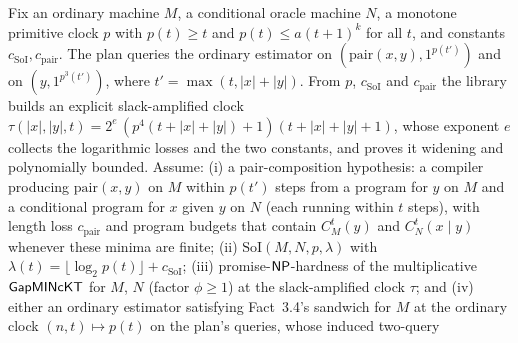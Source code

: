 \begin{theorem}
  \label{thm:avg-soi-collapse}
  \leanok
  Fix an ordinary machine $M$, a conditional oracle machine $N$, a monotone
  primitive clock $p$ with $p(t) \ge t$ and $p(t) \le a(t+1)^k$ for all $t$,
  and constants $c_{\mathrm{SoI}}, c_{\mathrm{pair}}$. The plan queries the
  ordinary estimator on $(\mathrm{pair}(x,y), 1^{p(t')})$ and on
  $(y, 1^{p^3(t')})$, where $t' = \max(t, |x|+|y|)$. From $p$,
  $c_{\mathrm{SoI}}$ and $c_{\mathrm{pair}}$ the library builds an explicit
  slack-amplified clock $\tau(|x|, |y|, t) = 2^{e}\,(p^4(t+|x|+|y|)+1)
  (t+|x|+|y|+1)$, whose exponent $e$ collects the logarithmic losses and the
  two constants, and proves it widening and polynomially bounded. Assume:
  (i) a pair-composition hypothesis: a compiler producing $\mathrm{pair}(x,y)$ on
  $M$ within $p(t')$ steps from a program for $y$ on $M$ and a conditional
  program for $x$ given $y$ on $N$ (each running within $t$ steps), with length
  loss $c_{\mathrm{pair}}$ and program budgets that contain $C^t_M(y)$ and
  $C^t_N(x \mid y)$ whenever these minima are finite;
  (ii) $\mathrm{SoI}(M, N, p, \lambda)$ with $\lambda(t) = \lfloor \log_2 p(t)
  \rfloor + c_{\mathrm{SoI}}$;
  (iii) promise-$\mathsf{NP}$-hardness of the multiplicative $\mathsf{GapMINcKT}$ for
  $M$, $N$ (factor $\phi \ge 1$) at the slack-amplified clock $\tau$; and
  (iv) either an ordinary estimator satisfying Fact~3.4's sandwich for $M$ at
  the ordinary clock $(n, t) \mapsto p(t)$ on the plan's queries, whose induced two-query

\end{theorem}
